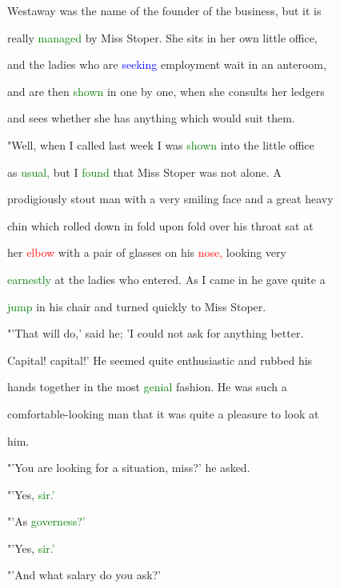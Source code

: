  Westaway was the name of the founder of the business, but it is

 really \textcolor{green}{managed} by Miss Stoper. She sits in her own little office,

 and the ladies who are \textcolor{blue}{seeking} employment \textcolor{BurntOrange}{wait} in an anteroom,

 and are then \textcolor{green}{shown} in one by one, when she consults her ledgers

 and sees whether she has anything which would suit them.



 "Well, when I called last week I was \textcolor{green}{shown} into the little office

 as \textcolor{green}{usual,} but I \textcolor{green}{found} that Miss Stoper was not alone. A

 prodigiously stout man with a very \textcolor{BurntOrange}{smiling} face and a great heavy

 chin which rolled down in fold upon fold over his throat sat at

 her \textcolor{red}{elbow} with a pair of glasses on his \textcolor{red}{nose,} looking very

 \textcolor{green}{earnestly} at the ladies who entered. As I came in he gave quite a

 \textcolor{green}{jump} in his chair and turned quickly to Miss Stoper.



 "'That will do,' said he; 'I could not ask for anything better.

 Capital! capital!' He seemed quite enthusiastic and rubbed his

 hands together in the most \textcolor{green}{genial} fashion. He was such a

 comfortable-looking man that it was quite a pleasure to look at

 him.



 "'You are looking for a situation, miss?' he asked.



 "'Yes, \textcolor{green}{sir.'}



 "'As \textcolor{green}{governess?'}



 "'Yes, \textcolor{green}{sir.'}



 "'And what \textcolor{BurntOrange}{salary} do you ask?'



